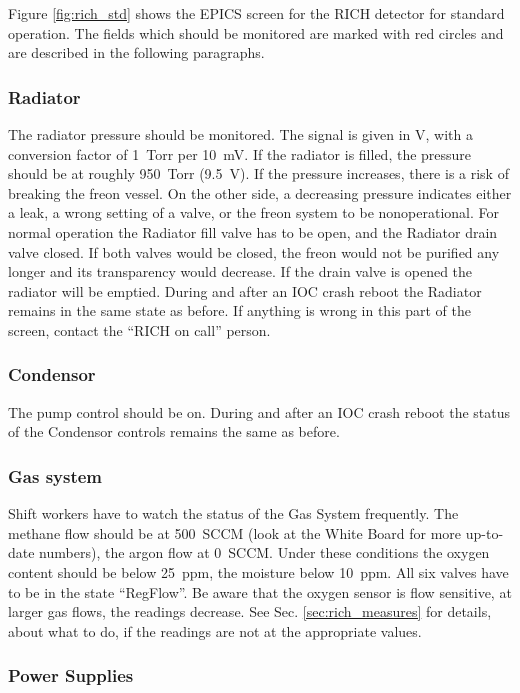 {{Figure \ref{fig:rich_std} shows the EPICS screen for 
the RICH detector for standard operation. The fields which 
should be monitored are marked with red circles and are 
described in the following paragraphs.
}

\subsubsection{Radiator}

The radiator pressure should be monitored. The signal is given in V,
with a conversion factor of 1~Torr  
per 10~mV. If the radiator is filled, the pressure should be 
at roughly 950~Torr (9.5~V). If the pressure increases, there 
is a risk of breaking the freon vessel. On the other side, a decreasing
pressure indicates either a leak, a wrong setting of a valve, or 
the freon system to be nonoperational.
For normal  operation the Radiator fill valve has to be open,
and the Radiator drain valve closed. If both valves would be closed,
the freon would not be purified any longer and its transparency
would decrease. If the drain valve is opened
the radiator will be emptied.
During and after an IOC crash reboot the Radiator remains in the same
state as before. 
If anything is wrong in this part of the screen, contact 
the ``RICH on call'' person.

\subsubsection{Condensor}

The pump control should be on. During and after an IOC crash reboot the
status of the Condensor controls remains the same as before.

\subsubsection{Gas system}

Shift workers have to watch the status of the Gas System frequently.
The methane flow should be at 500~SCCM (look at the White Board for
more up-to-date numbers), the argon flow at 0~SCCM.
Under these conditions the oxygen content should be below 25~ppm,
the moisture below 10~ppm. All six valves have to be in the state ``RegFlow''.
Be aware that the oxygen sensor is flow sensitive, at 
larger gas flows, the readings decrease. See Sec. \ref{sec:rich_measures} 
for details, about what to do, if the readings are not at the
appropriate values.

\subsubsection{Power Supplies}

}
